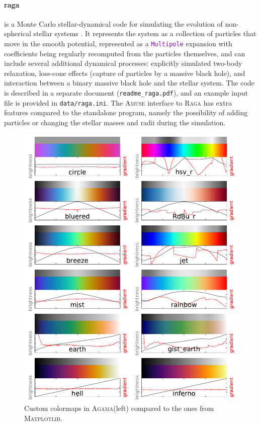 \documentclass[12pt]{article}
\newcommand{\Agama}{\textsc{Agama}\xspace}
\newcommand{\Amuse}{\textsc{Amuse}\xspace}
\newcommand{\Raga} {\textsc{Raga}\xspace}
\newcommand{\ttt}[1]{\textcolor{darkviolet}{\texttt{#1}}}
\let\oldparagraph\paragraph
\renewcommand{\paragraph}[1]{\vspace{-2mm}\oldparagraph{#1}}
\begin{document}
\paragraph{raga} is a Monte Carlo stellar-dynamical code for simulating the evolution of non-spherical stellar systems \cite{Vasiliev2015}. It represents the system as a collection of particles that move in the smooth potential, represented as a \ttt{Multipole} expansion with coefficients being regularly recomputed from the particles themselves, and can include several additional dynamical processes: explicitly simulated two-body relaxation, loss-cone effects (capture of particles by a massive black hole), and interaction between a binary massive black hole and the stellar system. The code is described in a separate document (\texttt{readme_raga.pdf}), and an example input file is provided in \texttt{data/raga.ini}. The \Amuse interface to \Raga has extra features compared to the standalone program, namely the possibility of adding particles or changing the stellar masses and radii during the simulation.

\begin{figure}
\begin{center}
\includegraphics{Colormaps.pdf}
\end{center}
\vspace*{-5mm}
\caption{Custom colormaps in \Agama (left) compared to the ones from \textsc{Matplotlib}.
}  \label{fig:colormaps}
\end{figure}
\end{document}
